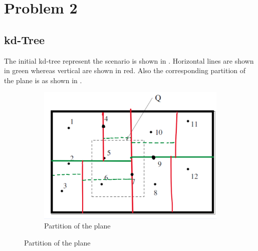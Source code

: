 \section{Problem 2}
\subsection{kd-Tree}
The initial kd-tree represent the scenario is shown in . Horizontal lines are shown in green whereas vertical are shown in red. Also the corresponding partition of the plane is as shown in .


\begin{figure}[H]
     \centering
     \begin{subfigure}[b]{0.45\textwidth}
         \centering
         \includegraphics[width=\textwidth]{Images/kd.jpg}
         \caption{Partition of the plane }
         \label{fig:kd}
     \end{subfigure}
     

\end{figure}
